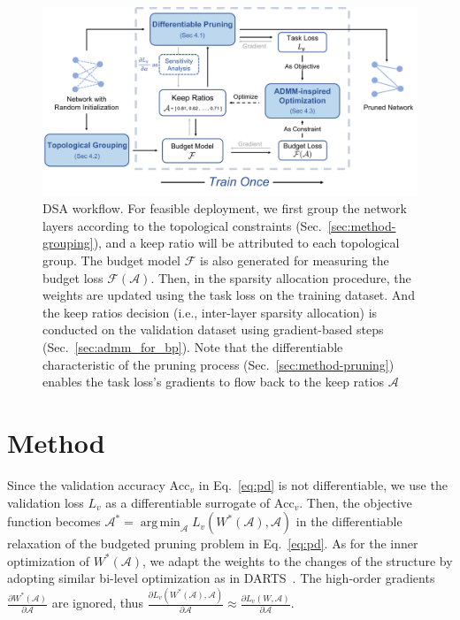 \documentclass[runningheads]{llncs}
\newcommand{\flops}{\mathcal{F}}
\DeclareMathOperator*{\argmin}{arg\,min}
\newcommand{\alphas}{\mathcal{A}}
\newcommand{\dsa}{DSA\xspace}
\begin{document}
  \begin{figure}[t]
  \begin{center}
    \includegraphics[width=0.98\linewidth]{figs/flow_a_new.pdf}
  \caption{\dsa workflow. For feasible deployment, we first group the network layers according to the topological constraints (Sec.~\ref{sec:method-grouping}), and a keep ratio will be attributed to each topological group.
  The budget model $\flops$ is also generated for measuring the budget loss $\flops(\alphas)$. 
  Then, in the sparsity allocation procedure, the weights are updated using the task loss on the training dataset. And the keep ratios decision (i.e., inter-layer sparsity allocation) is conducted on the validation dataset using gradient-based steps (Sec.~\ref{sec:admm_for_bp}). 
  Note that the differentiable characteristic of the pruning process (Sec.~\ref{sec:method-pruning}) enables the task loss's gradients to flow back to the keep ratios $\alphas$}  
  \label{fig:dsa_process}
  \end{center}
  \end{figure}
  
  
  \section{Method}
  \label{sec:method}
  
  
  Since the validation accuracy $\mbox{Acc}_v$ in Eq.~\ref{eq:pd} is not differentiable, we use the validation loss $L_v$ as a differentiable surrogate of $\mbox{Acc}_v$. Then, the objective function becomes $\alphas^{*} = \argmin_{\alphas} L_v(W^*(\alphas), \alphas)$ in the differentiable relaxation of the budgeted pruning problem in Eq.~\ref{eq:pd}.
  As for the inner optimization of $W^*(\alphas)$, we adapt the weights to the changes of the structure by adopting similar bi-level optimization as in DARTS~\cite{darts}. The high-order gradients $\frac{\partial W^*(\alphas)}{\partial \alphas}$ are ignored, thus
  $\frac{\partial L_v(W^*(\alphas), \alphas)}{\partial \alphas} \approx  \frac{\partial L_v(W, \alphas)}{\partial \alphas}$.
  
\end{document}
